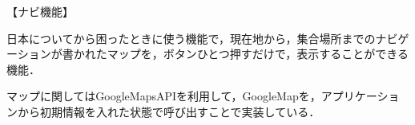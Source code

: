 【ナビ機能】
\par 日本についてから困ったときに使う機能で，現在地から，集合場所までのナビゲーションが書かれたマップを，ボタンひとつ押すだけで，表示することができる機能．
\par マップに関してはGoogleMapsAPIを利用して，GoogleMapを，アプリケーションから初期情報を入れた状態で呼び出すことで実装している．
